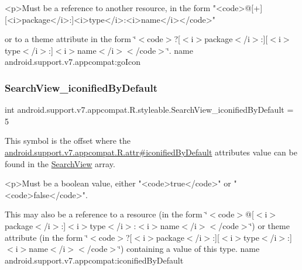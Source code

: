\begin{DoxyVerb}      <p>Must be a reference to another resource, in the form "<code>@[+][<i>package</i>:]<i>type</i>:<i>name</i></code>"
\end{DoxyVerb}
 or to a theme attribute in the form \char`\"{}$<$code$>$?\mbox{[}$<$i$>$package$<$/i$>$\+:\mbox{]}\mbox{[}$<$i$>$type$<$/i$>$\+:\mbox{]}$<$i$>$name$<$/i$>$$<$/code$>$\char`\"{}.  name android.\+support.\+v7.\+appcompat\+:go\+Icon \mbox{\label{classandroid_1_1support_1_1v7_1_1appcompat_1_1R_1_1styleable_a4dd3091dfa10ff0d05004332a0fbb677}} 
\subsubsection{\texorpdfstring{Search\+View\+\_\+iconified\+By\+Default}{SearchView\_iconifiedByDefault}}
{\footnotesize\ttfamily int android.\+support.\+v7.\+appcompat.\+R.\+styleable.\+Search\+View\+\_\+iconified\+By\+Default = 5\hspace{0.3cm}{\ttfamily [static]}}

This symbol is the offset where the \hyperlink{classandroid_1_1support_1_1v7_1_1appcompat_1_1R_1_1attr_a2f5e13cb01c52d709d8f0ca2895285e9}{android.\+support.\+v7.\+appcompat.\+R.\+attr\#iconified\+By\+Default} attribute\textquotesingle{}s value can be found in the \hyperlink{classandroid_1_1support_1_1v7_1_1appcompat_1_1R_1_1styleable_a01af09df9e38f1e4f57165c3d3cee9fe}{Search\+View} array.

\begin{DoxyVerb}      <p>Must be a boolean value, either "<code>true</code>" or "<code>false</code>".
\end{DoxyVerb}
 

This may also be a reference to a resource (in the form \char`\"{}$<$code$>$@\mbox{[}$<$i$>$package$<$/i$>$\+:\mbox{]}$<$i$>$type$<$/i$>$\+:$<$i$>$name$<$/i$>$$<$/code$>$\char`\"{}) or theme attribute (in the form \char`\"{}$<$code$>$?\mbox{[}$<$i$>$package$<$/i$>$\+:\mbox{]}\mbox{[}$<$i$>$type$<$/i$>$\+:\mbox{]}$<$i$>$name$<$/i$>$$<$/code$>$\char`\"{}) containing a value of this type.  name android.\+support.\+v7.\+appcompat\+:iconified\+By\+Default \mbox{\label{classandroid_1_1support_1_1v7_1_1appcompat_1_1R_1_1styleable_ad241a6c289e7efe81bf10167a3969b9a}} 
